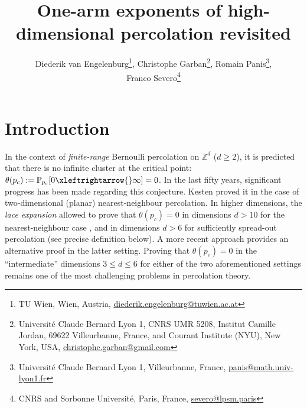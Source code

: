 \documentclass[11pt,a4paper]{article}
\title{One-arm exponents of high-dimensional percolation revisited}
\numberwithin{equation}{section}
\theoremstyle{plain}
\theoremstyle{definition}
\newcommand{\connect}{\xleftrightarrow}
\newcommand{\1}{\mathbf 1}
\begin{document}
	\author{Diederik van Engelenburg\footnotemark[1]\footnote{TU Wien, Wien, Austria, \url{diederik.engelenburg@tuwien.ac.at}}\:, Christophe Garban\footnotemark[2]\footnote{
Universit\'e Claude Bernard Lyon 1, CNRS UMR 5208, Institut Camille Jordan, 69622 Villeurbanne, France, and Courant Institute (NYU), New York, USA, \url{christophe.garban@gmail.com}}\:, Romain Panis\footnotemark[3]\footnote{Universit\'e Claude Bernard Lyon 1, Villeurbanne, France, \url{panis@math.univ-lyon1.fr}}\:,\\ Franco Severo\footnotemark[4]\footnote{CNRS and Sorbonne Universit\'e, Paris, France, \url{severo@lpsm.paris}}}


	\maketitle




	
	
	\section{Introduction}\label{sec:intro}
	
		In the context of \emph{finite-range} Bernoulli percolation on $\mathbb Z^d$ ($d\geq 2$), it is predicted that there is no infinite cluster at the critical point: $\theta(p_c):=\mathbb P_{p_c}[0\connect{}\infty]=0$. In the last fifty years, significant progress has been made regarding this conjecture. Kesten \cite{Kesten1980criticalproba} proved it in the case of two-dimensional (planar) nearest-neighbour percolation. In higher dimensions, the \emph{lace expansion} allowed to prove that $\theta(p_c)=0$ in dimensions $d>10$ for the nearest-neighbour case \cite{HaraSlade1990Perco,HaraDecayOfCorrelationsInVariousModels2008,FitznervdHofstad2017Percod10}, and in dimensions $d>6$ for sufficiently spread-out percolation \cite{HaraSladevdHofstad2003PercoSO} (see precise definition below). A more recent approach \cite{DumPan24Perco} provides an alternative proof in the latter setting. Proving that $\theta(p_c)=0$ in the ``intermediate'' dimensions $3\leq d\leq 6$ for either of the two aforementioned settings remains one of the most challenging problems in percolation theory. 
		
\end{document}
